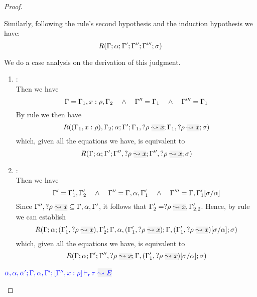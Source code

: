 \begin{proof}
\begin{description}
  Similarly, following the rule's second hypothesis and the induction hypothesis we have:
\begin{equation*}
  R(\Gamma;\alpha;\Gamma';\Gamma'';\Gamma''';\sigma)
\end{equation*}

  We do a case analysis on the derivation of this judgment.
  \begin{enumerate}
  \item {}: \\ Then we have
\begin{equation*}
  \Gamma = \Gamma_1,x:\rho,\Gamma_2  \quad\wedge\quad \Gamma'' = \Gamma_1 \quad\wedge\quad \Gamma''' = \Gamma_1
\end{equation*}
       By rule  we then have
\begin{equation*}
R((\tenv_1,x:\rulet),\tenv_2;\alpha;\tenv';\tenv_1,\envi{\rulet}{x};\tenv_1,\envi{\rulet}{x};\suty)
\end{equation*}
        which, given all the equations we have, is equivalent to
\begin{equation*}
R(\tenv;\alpha;\tenv';\tenv'',\envi{\rulet}{x};\tenv'',\envi{\rulet}{x};\suty)
\end{equation*}

  \item {}: \\
   Then we have
\begin{equation*}
  \Gamma' = \Gamma_1',\Gamma_2'  \quad\wedge\quad \Gamma'' = \Gamma,\alpha,\Gamma_1' \quad\wedge\quad 
      \Gamma''' = \Gamma,\Gamma_1'[\sigma/\alpha]
\end{equation*}
  Since $\tenv'',\envi{\rulet}{x} \subseteq \tenv,\alpha,\tenv'$, it follows that $\tenv_2' = \envi{\rulet}{x},\tenv_{2,2}'$.
  Hence, by rule  we can establish
\begin{equation*}
R(\tenv;\alpha;(\tenv_1',\envi{\rulet}{x}),\tenv_2';\tenv,\alpha,(\tenv_1',\envi{\rulet}{x});\tenv,(\tenv_1',\envi{\rulet}{x})[\suty/\alpha];\suty)
\end{equation*}
        which, given all the equations we have, is equivalent to
\begin{equation*}
R(\tenv;\alpha;\tenv';\tenv'',\envi{\rulet}{x};\tenv,(\tenv_1',\envi{\rulet}{x})[\suty/\alpha];\suty)
\end{equation*}
  \end{enumerate}
  
\item[\fbox{\rref{L-Var}}]\quad$\dlres{\bar{\alpha},\alpha,\bar{\alpha}'}{\tenv,\alpha,\tenv'}{\tenv'', \relation{x}{\rulet}}{\type}{E}$\ \\


\end{description}
\end{proof}

